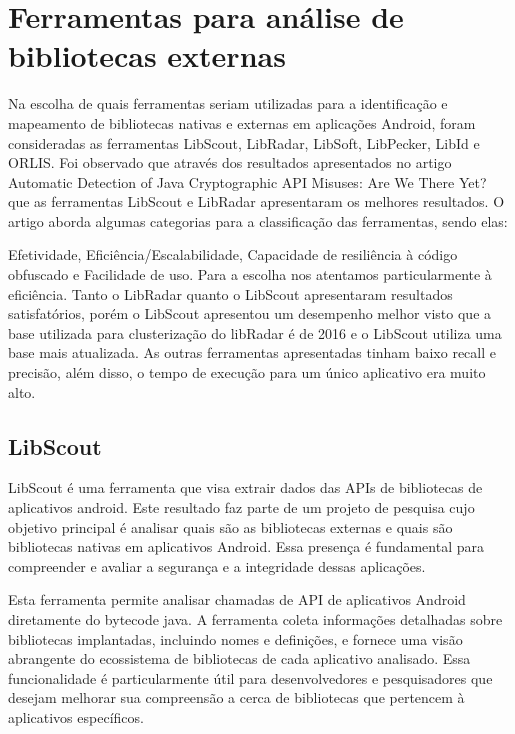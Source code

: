 \section{Ferramentas para análise de bibliotecas externas} %

Na escolha de quais ferramentas seriam utilizadas para a identificação e mapeamento de bibliotecas nativas e externas em aplicações Android, foram consideradas as ferramentas LibScout, LibRadar, LibSoft, LibPecker, LibId e ORLIS. Foi observado que através dos resultados apresentados no artigo Automatic Detection of Java Cryptographic API Misuses: Are We There Yet? que as ferramentas LibScout e LibRadar apresentaram os melhores resultados. O artigo aborda algumas categorias para a classificação das ferramentas, sendo elas:

Efetividade, Eficiência/Escalabilidade, Capacidade de resiliência à código obfuscado e Facilidade de uso. Para a escolha nos atentamos particularmente à eficiência. Tanto o LibRadar quanto o LibScout apresentaram resultados satisfatórios, porém o LibScout apresentou um desempenho melhor visto que a base utilizada para clusterização do libRadar é de 2016 e o LibScout utiliza uma base mais atualizada. As outras ferramentas apresentadas tinham baixo recall e precisão, além disso, o tempo de execução para um único aplicativo era muito alto.

\subsection{LibScout} %

LibScout é uma ferramenta que visa extrair dados das APIs de bibliotecas de aplicativos android. Este resultado faz parte de um projeto de pesquisa cujo objetivo principal é analisar quais são as bibliotecas externas e quais são bibliotecas nativas em aplicativos Android. Essa presença é fundamental para compreender e avaliar a segurança e a integridade dessas aplicações.

Esta ferramenta permite analisar chamadas de API de aplicativos Android diretamente do bytecode java. A ferramenta coleta informações detalhadas sobre bibliotecas implantadas, incluindo nomes e definições, e fornece uma visão abrangente do ecossistema de bibliotecas de cada aplicativo analisado. Essa funcionalidade é particularmente útil para desenvolvedores e pesquisadores que desejam melhorar sua compreensão a cerca de bibliotecas que pertencem à aplicativos específicos.

